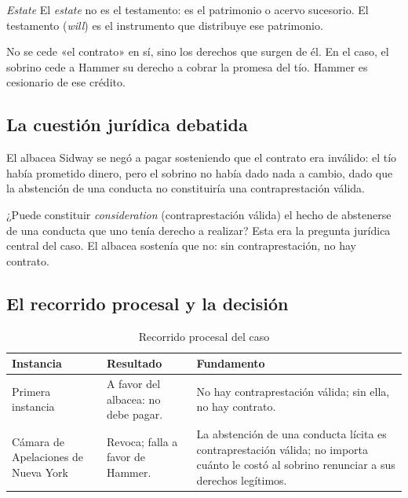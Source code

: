 \documentclass[12pt,oneside]{book}
\begin{document}
\begin{definition}{\textit{Estate}}
El \textit{estate} no es el testamento: es el patrimonio o acervo sucesorio. El testamento (\textit{will}) es el instrumento que distribuye ese patrimonio.
\end{definition}

\begin{note}
No se cede «el contrato» en sí, sino los derechos que surgen de él. En el caso, el sobrino cede a Hammer su derecho a cobrar la promesa del tío. Hammer es cesionario de ese crédito.
\end{note}

\subsection{La cuestión jurídica debatida}

El albacea Sidway se negó a pagar sosteniendo que el contrato era inválido: el tío había prometido dinero, pero el sobrino no había dado nada a cambio, dado que la abstención de una conducta no constituiría una contraprestación válida.

\begin{important}
¿Puede constituir \textit{consideration} (contraprestación válida) el hecho de abstenerse de una conducta que uno tenía derecho a realizar? Esta era la pregunta jurídica central del caso. El albacea sostenía que no: sin contraprestación, no hay contrato.
\end{important}

\subsection{El recorrido procesal y la decisión}

\begin{table}[H]
\centering
\caption{Recorrido procesal del caso}
\begin{tabularx}{\textwidth}{>{\raggedright\arraybackslash}p{} >{\raggedright\arraybackslash}p{} >{\raggedright\arraybackslash}X}
\toprule
\textbf{Instancia} & \textbf{Resultado} & \textbf{Fundamento} \\
\midrule
Primera instancia & A favor del albacea: no debe pagar. & No hay contraprestación válida; sin ella, no hay contrato. \\
Cámara de Apelaciones de Nueva York & Revoca; falla a favor de Hammer. & La abstención de una conducta lícita es contraprestación válida; no importa cuánto le costó al sobrino renunciar a sus derechos legítimos. \\
\bottomrule
\end{tabularx}
\end{table}
\end{document}
